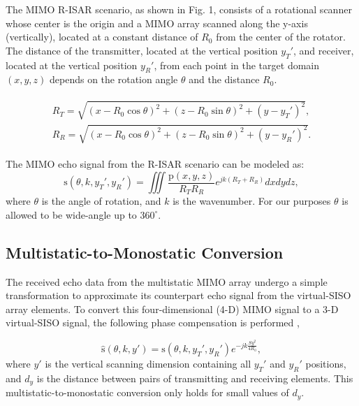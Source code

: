 \documentclass[conference]{IEEEtran}
\begin{document}
		The MIMO R-ISAR scenario, as shown in Fig. 1, consists of a rotational scanner whose center is the origin and a MIMO array scanned along the y-axis (vertically), located at a constant distance of $R_0$ from the center of the rotator. The distance of the transmitter, located at the vertical position $y_T'$, and receiver, located at the vertical position $y_R'$, from each point in the target domain $(x,y,z)$ depends on the rotation angle $\theta$ and the distance $R_0$.
		
		\begin{align}
		\begin{split}
		R_T = \sqrt{(x - R_0 \cos\theta)^2 + (z - R_0 \sin\theta)^2 + (y - y_T')^2}, \\
		R_R = \sqrt{(x - R_0 \cos\theta)^2 + (z - R_0 \sin\theta)^2 + (y - y_R')^2}.
		\end{split}
		\end{align}
		
		The MIMO echo signal from the R-ISAR scenario can be modeled as:
		\begin{equation}
		\label{Eq_mimo_echo_signal}
		\text{s}(\theta,k,y_T',y_R') = \iiint \frac{\text{p}(x,y,z)}{R_T R_R} e^{jk(R_T + R_R)} dx dy dz,
		\end{equation}
		where $\theta$ is the angle of rotation, and $k$ is the wavenumber. For our purposes $\theta$ is allowed to be wide-angle up to $360^{\circ}$.
		
		
		\subsection{Multistatic-to-Monostatic Conversion}
		\label{Sec_multistatic_to_monostatic_conversion}
		
		The received echo data from the multistatic MIMO array undergo a simple transformation to approximate its counterpart echo signal from the virtual-SISO array elements. To convert this four-dimensional (4-D) MIMO signal to a 3-D virtual-SISO signal, the following phase compensation is performed \cite{Yanik:CascadedMIMO,Yanik:NearFieldMIMOSAR},
		
		\begin{equation}
		\label{Eq_phase_compensation}
		\hat{\text{s}}(\theta,k,y') = \text{s}(\theta,k,y_T',y_R') e^{-jk\frac{Sy^2}{4R_0}},
		\end{equation}
		where $y'$ is the vertical scanning dimension containing all $y_T'$ and $y_R'$ positions, and $d_y$ is the distance between pairs of transmitting and receiving elements. This multistatic-to-monostatic conversion only holds for small values of $d_y$.
		
\end{document}
